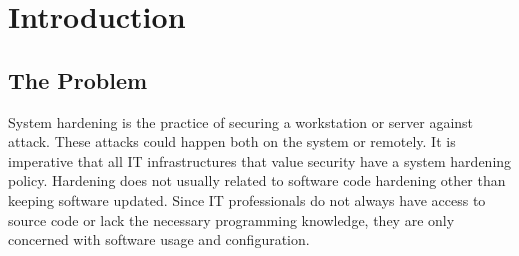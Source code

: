 \chapter{Introduction} \label{ch:introduction}
\section{The Problem} \label{sec:problem}
System hardening is the practice of securing a workstation or server against attack.  These attacks could happen both on the system or remotely.  It is imperative that all IT infrastructures that value security have a system hardening policy.  Hardening does not usually related to software code hardening other than keeping software updated.  Since IT professionals do not always have access to source code or lack the necessary programming knowledge, they are only concerned with software usage and configuration.  
